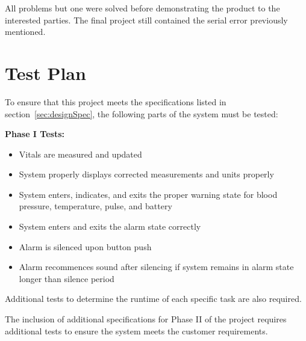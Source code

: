 \documentclass[12pt]{article} %
\begin{document}
    All problems but one were solved before demonstrating the product to the interested
    parties. The final project still contained the serial error previously mentioned.
    
    \section{Test Plan} 

    To ensure that this project meets the specifications listed in 
    section~\ref{sec:designSpec}, the following parts of the system must be 
    tested: 

		\textbf{Phase I Tests:}
    \begin{itemize}
      \item Vitals are measured and updated
      \item System properly displays corrected measurements and units properly
      \item System enters, indicates, and exits the proper warning state for
	blood pressure, temperature, pulse, and battery
      \item System enters and exits the alarm state correctly
      \item Alarm is silenced upon button push
      \item Alarm recommences sound after silencing if system remains in alarm
	state longer than silence period
    \end{itemize}

    Additional tests to determine the runtime of each specific task are also
    required.

    The inclusion of additional specifications for Phase II of the project
    requires additional tests to ensure the system meets the customer
    requirements.
\end{document}
